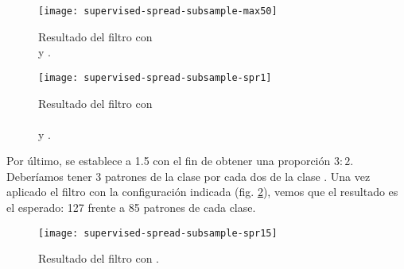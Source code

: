 \begin{figure}[H]
    \centering
    \begin{minipage}{0.50\textwidth}
        \centering
        \texttt{[image: supervised-spread-subsample-max50]}
        \caption{Resultado del filtro con\\ y .}
        \label{fig:supervised-spread-subsample-max50}
    \end{minipage}\hfill
    \begin{minipage}{0.50\textwidth}
        \centering
        \texttt{[image: supervised-spread-subsample-spr1]}
        \caption{Resultado del filtro con\\\\ y .}
        \label{fig:supervised-spread-subsample-spr1}
    \end{minipage}
\end{figure}

Por último, se establece  a 1.5 con el fin de obtener una proporción $3:2$. Deberíamos tener 3 patrones de la clase  por cada dos de la clase . Una vez aplicado el filtro con la configuración indicada (fig. \ref{fig:supervised-spread-subsample-spr1.5}), vemos que el resultado es el esperado: 127 frente a 85 patrones de cada clase.
\begin{figure}[ht]
    \centering
    \texttt{[image: supervised-spread-subsample-spr15]}
    \caption{Resultado del filtro con .}
    \label{fig:supervised-spread-subsample-spr1.5}
\end{figure}